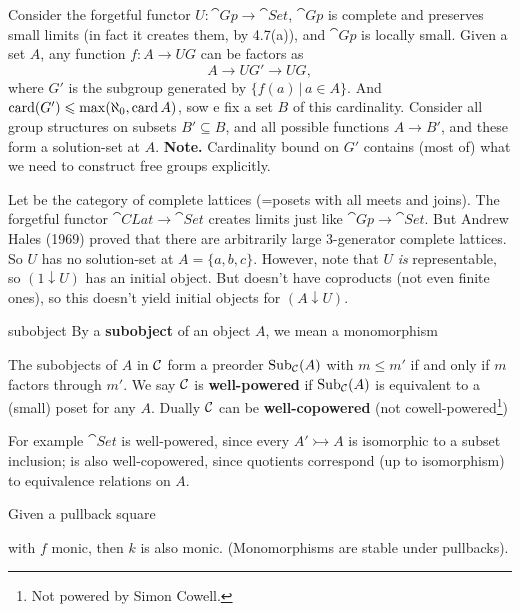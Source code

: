 \documentclass{article}
\begin{document}
\begin{exs}{}
    \item[(a)] Consider the forgetful functor $U: \cat{Gp} \to \cat{Set}$, $\cat{Gp}$ is complete and preserves small limits (in fact it creates them, by 4.7(a)), and $\cat{Gp}$ is locally small. Given a set $A$, any function $f: A \to UG$ can be factors as \[ A \rightarrow UG' \rightarrow UG,\] where $G'$ is the subgroup generated by $\{f(a) \, | \, a \in A\}$. And $\operatorname{card}(G') \leqslant \max(\aleph_{0}, \operatorname{card} A)$, sow e fix a set $B$ of this cardinality. Consider all group structures on subsets $B' \subseteq B$, and all possible functions $A \to B'$, and these form a solution-set at $A$. \gap \textbf{Note.} Cardinality bound on $G'$ contains (most of) what we need to construct free groups explicitly.
    \item[(b)] Let  be the category of complete lattices (=posets with all meets and joins). The forgetful functor $\cat{CLat} \to \cat{Set}$ creates limits just like $\cat{Gp} \to \cat{Set}$. But Andrew Hales (1969) proved that there are arbitrarily large 3-generator complete lattices. So $U$ has no solution-set at $A=\{a,b,c\}$. However, note that $U$ \textit{is} representable, so $(1 \downarrow U)$ has an initial object. But  doesn't have coproducts (not even finite ones), so this doesn't yield initial objects for $(A \downarrow U)$.
\end{exs}
\begin{fancydefine}{subobject}
    By a \textbf{subobject} of an object $A$, we mean a monomorphism \begin{center}
\end{center}
The subobjects of $A$ in $\mathcal{C}$ form a preorder $\operatorname{Sub}_{\mathcal{C}}(A)$ with $m \leq m'$ if and only if $m$ factors through $m'$. We say $\mathcal{C}$ is \textbf{well-powered} if $\operatorname{Sub}_{\mathcal{C}}(A)$ is equivalent to a (small) poset for any $A$. Dually $\mathcal{C}$ can be \textbf{well-copowered} (not cowell-powered\footnote{Not powered by Simon Cowell.})
\end{fancydefine}
For example $\cat{Set}$ is well-powered, since every $A' \rightarrowtail A$ is isomorphic to a subset inclusion;  is also well-copowered, since quotients correspond (up to isomorphism) to equivalence relations on $A$.
\begin{fancylem}{}
    Given a pullback square \begin{center}
    \end{center}
    with $f$ monic, then $k$ is also monic. (Monomorphisms are stable under pullbacks).
\end{fancylem}
\end{document}

